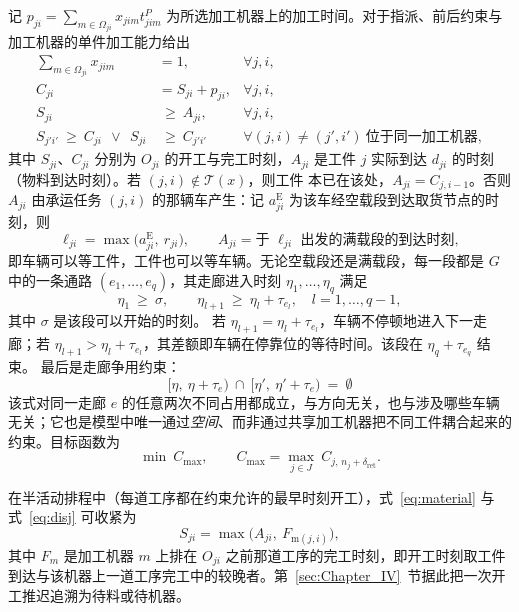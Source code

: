 \documentclass[manuscript,screen,review]{acmart}
\begin{document}
记 $p_{ji}=\sum_{m\in\Omega_{ji}}x_{jim}t^P_{jim}$ 为所选加工机器上的加工时间。对于指派、前后约束与
加工机器的单件加工能力给出
\begin{align}
\sum_{m\in\Omega_{ji}} x_{jim} &= 1, & \forall j,i,
\label{eq:assign}\\
C_{ji} &= S_{ji}+p_{ji}, & \forall j,i,
\label{eq:dur}\\
S_{ji} &\ \ge\ A_{ji}, & \forall j,i,
\label{eq:material}\\
S_{j'i'}\ \ge\ C_{ji}\ \ \vee\ \ S_{ji} &\ \ge\ C_{j'i'}
& \forall (j,i)\neq(j',i')\ \text{位于同一加工机器},
\label{eq:disj}
\end{align}
其中 $S_{ji}$、$C_{ji}$ 分别为 $O_{ji}$ 的开工与完工时刻，$A_{ji}$ 是工件 $j$ 实际到达 $d_{ji}$ 的时刻（物料到达时刻）。若 $(j,i)\notin\mathcal{T}(x)$，则工件
本已在该处，$A_{ji}=C_{j,i-1}$。否则 $A_{ji}$ 由承运任务 $(j,i)$ 的那辆车产生：记
$a^{\mathrm{E}}_{ji}$ 为该车经空载段到达取货节点的时刻，则
\begin{equation}
\label{eq:load}
\ell_{ji}=\max\bigl(a^{\mathrm{E}}_{ji},\ r_{ji}\bigr),
\qquad
A_{ji}=\text{于 } \ell_{ji} \text{ 出发的满载段的到达时刻},
\end{equation}
即车辆可以等工件，工件也可以等车辆。无论空载段还是满载段，每一段都是 $G$ 中的一条通路
$(e_1,\dots,e_q)$，其走廊进入时刻 $\eta_1,\dots,\eta_q$ 满足
\begin{equation}
\label{eq:walk}
\eta_1 \ \ge\ \sigma, \qquad
\eta_{l+1}\ \ge\ \eta_l+\tau_{e_l}, \quad l=1,\dots,q-1,
\end{equation}
其中 $\sigma$ 是该段可以开始的时刻。
若 $\eta_{l+1}=\eta_l+\tau_{e_l}$，车辆不停顿地进入下一走廊；若 $\eta_{l+1}>\eta_l+\tau_{e_l}$，其差额即车辆在停靠位的等待时间。该段在 $\eta_q+\tau_{e_q}$ 结束。
最后是走廊争用约束：
\begin{equation}
\label{eq:excl}
\bigl[\eta,\ \eta+\tau_e\bigr)\ \cap\
\bigl[\eta',\ \eta'+\tau_e\bigr)\ =\ \emptyset
\end{equation}
该式对同一走廊 $e$ 的任意两次不同占用都成立，与方向无关，也与涉及哪些车辆无关；它也是模型中唯一通过\emph{空间}、而非通过共享加工机器把不同工件耦合起来的约束。目标函数为
\begin{equation}
\label{eq:obj}
\min\ C_{\max},\qquad
C_{\max}=\max_{j\in J}\ C_{j,\,n_j+\delta_{\mathrm{ret}}} .
\end{equation}

在半活动排程中（每道工序都在约束允许的最早时刻开工），式~\eqref{eq:material} 与式~\eqref{eq:disj} 可收紧为
\begin{equation}
\label{eq:bind}
S_{ji}=\max\bigl(A_{ji},\ F_{\mathrm{m}(j,i)}\bigr),
\end{equation}
其中 $F_m$ 是加工机器 $m$ 上排在 $O_{ji}$ 之前那道工序的完工时刻，即开工时刻取工件到达与该机器上一道工序完工中的较晚者。第~\ref{sec:Chapter_IV}~节据此把一次开工推迟追溯为待料或待机器。
\end{document}
